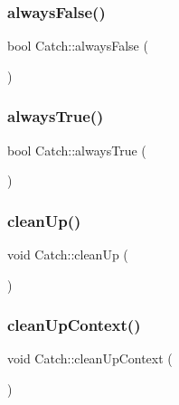 \subsubsection{\texorpdfstring{always\+False()}{alwaysFalse()}}
{\footnotesize\ttfamily bool Catch\+::always\+False (\begin{DoxyParamCaption}{ }\end{DoxyParamCaption})\hspace{0.3cm}{\ttfamily [inline]}}

\mbox{\label{namespace_catch_a129be2186a2f6546206ec52c4bf2156f}} 
\subsubsection{\texorpdfstring{always\+True()}{alwaysTrue()}}
{\footnotesize\ttfamily bool Catch\+::always\+True (\begin{DoxyParamCaption}{ }\end{DoxyParamCaption})\hspace{0.3cm}{\ttfamily [inline]}}

\mbox{\label{namespace_catch_a0f78e9afdebc6d4512d18e76fbf54b8c}} 
\subsubsection{\texorpdfstring{clean\+Up()}{cleanUp()}}
{\footnotesize\ttfamily void Catch\+::clean\+Up (\begin{DoxyParamCaption}{ }\end{DoxyParamCaption})}

\mbox{\label{namespace_catch_ae50508f10ffc4ed873a31a4db4caea16}} 
\subsubsection{\texorpdfstring{clean\+Up\+Context()}{cleanUpContext()}}
{\footnotesize\ttfamily void Catch\+::clean\+Up\+Context (\begin{DoxyParamCaption}{ }\end{DoxyParamCaption})}

